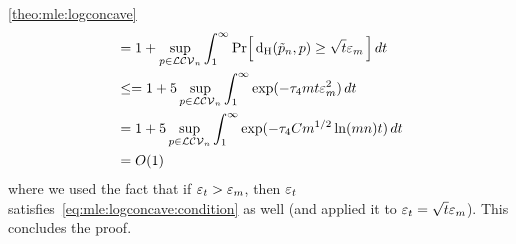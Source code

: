\begin{proofof}{\cref{theo:mle:logconcave}}
\begin{align*}
        &= 1+ \sup_{p\in\classlogconcave[n]} \int_1^\infty {  \probaOf{  \hellinger{\tilde{p}_n}{p} \geq \sqrt{t}\eps_{m} } }\, dt \\
        &\leq = 1+ 5\sup_{p\in\classlogconcave[n]} \int_1^\infty \exp(-\tau_4 m t\eps_m^2)\, dt \\
        &= 1+ 5\sup_{p\in\classlogconcave[n]} \int_1^\infty \exp(-\tau_4 Cm^{1/2}\ln(mn) t)\, dt \\
        &= O(1)
    \end{align*}
    where we used the fact that if $\varepsilon_t > \varepsilon_m$, then $\varepsilon_t$ satisfies~\eqref{eq:mle:logconcave:condition} as well (and applied it to $\varepsilon_t = \sqrt{t}\varepsilon_{m}$). This concludes the proof.
\end{proofof}
